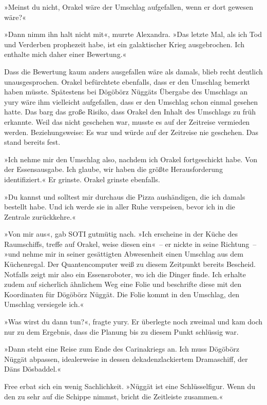 »Meinst du nicht, Orakel wäre der Umschlag aufgefallen, wenn er dort gewesen wäre?«

»Dann nimm ihn halt nicht mit«, murrte Alexandra. »Das letzte Mal, als ich Tod und Verderben prophezeit habe, ist ein galaktischer Krieg ausgebrochen. Ich enthalte mich daher einer Bewertung.«

Dass die Bewertung kaum anders ausgefallen wäre als damals, blieb recht deutlich unausgesprochen. Orakel befürchtete ebenfalls, dass er den Umschlag bemerkt haben müsste. Spätestens bei Dögöbörz Nüggäts Übergabe des Umschlags an yury wäre ihm vielleicht aufgefallen, dass er den Umschlag schon einmal gesehen hatte. Das barg das große Risiko, dass Orakel den Inhalt des Umschlags zu früh erkannte. Weil das nicht geschehen war, musste es auf der Zeitreise vermieden werden. Beziehungsweise: Es war und würde auf der Zeitreise nie geschehen. Das stand bereits fest.

»Ich nehme mir den Umschlag also, nachdem ich Orakel fortgeschickt habe. Von der Essensausgabe. Ich glaube, wir haben die größte Herausforderung identifiziert.« Er grinste. Orakel grinste ebenfalls.

»Du kannst und solltest mir durchaus die Pizza aushändigen, die ich damals bestellt habe. Und ich werde sie in aller Ruhe verspeisen, bevor ich in die Zentrale zurückkehre.«

»Von mir aus«, gab SOTI gutmütig nach. »Ich erscheine in der Küche des Raumschiffs, treffe auf Orakel, weise diesen ein«~– er nickte in seine Richtung~– »und nehme mir in seiner gesättigten Abwesenheit einen Umschlag aus dem Küchenregal. Der Quantencomputer weiß zu diesem Zeitpunkt bereits Bescheid. Notfalls zeigt mir also ein Essensroboter, wo ich die Dinger finde. Ich erhalte zudem auf sicherlich ähnlichem Weg eine Folie und beschrifte diese mit den Koordinaten für Dögöbörz Nüggät. Die Folie kommt in den Umschlag, den Umschlag versiegele ich.«

»Was wirst du dann tun?«, fragte yury. Er überlegte noch zweimal und kam doch nur zu dem Ergebnis, dass die Planung bis zu diesem Punkt schlüssig war.

»Dann steht eine Reise zum Ende des Carinakriegs an. Ich muss Dögöbörz Nüggät abpassen, idealerweise in dessen dekadenzlackiertem Dramaschiff, der Däns Dösbaddel.«

Free erbat sich ein wenig Sachlichkeit. »Nüggät ist eine Schlüsselfigur. Wenn du den zu sehr auf die Schippe nimmst, bricht die Zeitleiste zusammen.«

